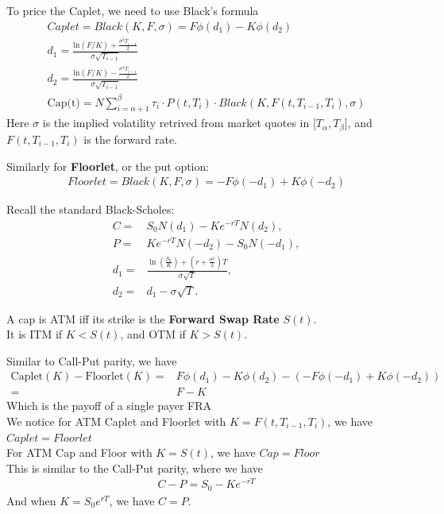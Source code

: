 To price the Caplet, we need to use Black's formula
\begin{align*}
    Caplet = Black(K, F, \sigma) = F \phi(d_1) - K \phi(d_2)\\
    d_1 = \frac{\text{ln}(F/K) + \frac{\sigma^2 T_{i-1}}{2}}{\sigma \sqrt{T_{i-1}}}\\
    d_2 = \frac{\text{ln}(F/K) - \frac{\sigma^2 T_{i-1}}{2}}{\sigma \sqrt{T_{i-1}}}\\
    \text{Cap(t)} = N \sum_{i = \alpha + 1}^{\beta} \tau_i \cdot P(t, T_i) \cdot Black(K, F(t,T_{i-1}, T_i) , \sigma)
\end{align*}
Here $\sigma$ is the implied volatility retrived from market quotes in [$T_\alpha, T_\beta$], and $F(t,T_{i-1}, T_i)$ is the forward rate.

Similarly for \textbf{Floorlet}, or the put option:
\begin{align*}
    Floorlet = Black(K, F, \sigma) = - F \phi(-d_1) + K \phi(-d_2)
\end{align*}

Recall the standard Black-Scholes:
\begin{align*}
    C =& S_0 N(d_1) - K e^{-rT} N(d_2), \\
    P =& K e^{-rT} N(-d_2) - S_0 N(-d_1),\\
d_1 =& \frac{\ln \left( \frac{S_0}{K} \right) + \left( r + \frac{\sigma^2}{2} \right)T}{\sigma \sqrt{T}},\\
d_2 =& d_1 - \sigma \sqrt{T}.
\end{align*}

\begin{remark}
    A cap is ATM iff its strike is the \textbf{Forward Swap Rate} $S(t)$. \\
    It is ITM if $ K < S(t) $, and OTM if $ K > S(t) $.
\end{remark}
\begin{remark}
    Similar to Call-Put parity, we have
    \begin{align*}
        \text{Caplet}(K) - \text{Floorlet}(K) =& F \phi(d_1) - K \phi(d_2) - ( - F \phi(-d_1) + K \phi(-d_2)) \\
        =& F - K 
    \end{align*}
    Which is the payoff of a single payer FRA\\
    We notice for ATM Caplet and Floorlet with $K = F(t, T_{i-1}, T_i)$, we have $ Caplet= Floorlet $\\
    For ATM Cap and Floor with $ K = S(t) $, we have $ Cap = Floor $ \\
    This is similar to the Call-Put parity, where we have
    \begin{align*}
        C - P = S_0 - K e^{-rT}
    \end{align*}
    And when $K = S_0 e^{rT}$, we have $C = P$.
\end{remark}

